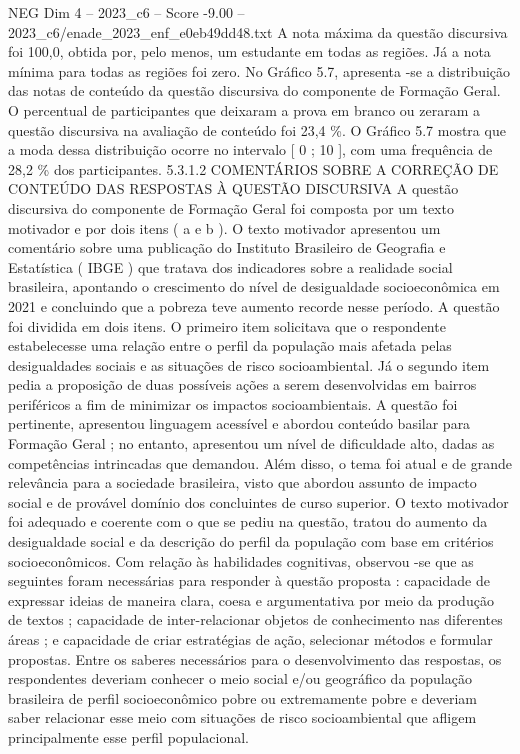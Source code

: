 \begin{textsample}{NEG Dim 4 – 2023\_c6 – Score -9.00 – 2023\_c6/enade\_2023\_enf\_e0eb49dd48.txt}
A nota máxima da questão discursiva foi 100,0, obtida por, pelo menos, um estudante em todas as regiões.
Já a nota mínima para todas as regiões foi zero.
No Gráfico 5.7, apresenta -se a distribuição das notas de conteúdo da questão discursiva do componente de Formação Geral.
O percentual de participantes que deixaram a prova em branco ou zeraram a questão discursiva na avaliação de conteúdo foi 23,4 \%.
O Gráfico 5.7 mostra que a moda dessa distribuição ocorre no intervalo [ 0 ; 10 ], com uma frequência de 28,2 \% dos participantes. 5.3.1.2 COMENTÁRIOS SOBRE A CORREÇÃO DE CONTEÚDO DAS RESPOSTAS À QUESTÃO DISCURSIVA A questão discursiva do componente de Formação Geral foi composta por um texto motivador e por dois itens ( a e b ).
O texto motivador apresentou um comentário sobre uma publicação do Instituto Brasileiro de Geografia e Estatística ( IBGE ) que tratava dos indicadores sobre a realidade social brasileira, apontando o crescimento do nível de desigualdade socioeconômica em 2021 e concluindo que a pobreza teve aumento recorde nesse período.
A questão foi dividida em dois itens.
O primeiro item solicitava que o respondente estabelecesse uma relação entre o perfil da população mais afetada pelas desigualdades sociais e as situações de risco socioambiental.
Já o segundo item pedia a proposição de duas possíveis ações a serem desenvolvidas em bairros periféricos a fim de minimizar os impactos socioambientais.
A questão foi pertinente, apresentou linguagem acessível e abordou conteúdo basilar para Formação Geral ; no entanto, apresentou um nível de dificuldade alto, dadas as competências intrincadas que demandou.
Além disso, o tema foi atual e de grande relevância para a sociedade brasileira, visto que abordou assunto de impacto social e de provável domínio dos concluintes de curso superior.
O texto motivador foi adequado e coerente com o que se pediu na questão, tratou do aumento da desigualdade social e da descrição do perfil da população com base em critérios socioeconômicos.
Com relação às habilidades cognitivas, observou -se que as seguintes foram necessárias para responder à questão proposta : capacidade de expressar ideias de maneira clara, coesa e argumentativa por meio da produção de textos ; capacidade de inter-relacionar objetos de conhecimento nas diferentes áreas ; e capacidade de criar estratégias de ação, selecionar métodos e formular propostas.
Entre os saberes necessários para o desenvolvimento das respostas, os respondentes deveriam conhecer o meio social e/ou geográfico da população brasileira de perfil socioeconômico pobre ou extremamente pobre e deveriam saber relacionar esse meio com situações de risco socioambiental que afligem principalmente esse perfil populacional.

\end{textsample}
